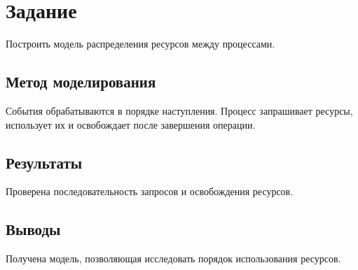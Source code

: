 \documentclass{tex2sto}
\begin{document}
\section{Задание}
Построить модель распределения ресурсов между процессами.

\subsection{Метод моделирования}
События обрабатываются в порядке наступления. Процесс запрашивает ресурсы,
использует их и освобождает после завершения операции.

\subsection{Результаты}
Проверена последовательность запросов и освобождения ресурсов.

\subsection{Выводы}
Получена модель, позволяющая исследовать порядок использования ресурсов.
\end{document}

